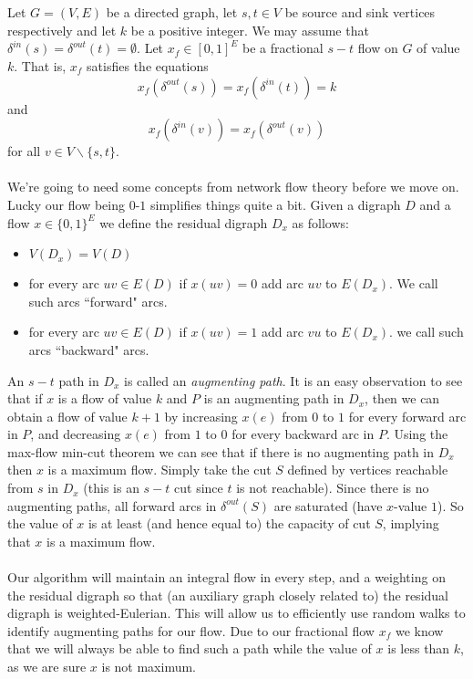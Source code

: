 \documentclass[letterpaper,12pt,oneside,onecolumn]{article}
\begin{document}
	\section{}
	\paragraph{}
	Let $G=(V,E)$ be a directed graph, let $s,t\in V$ be source and sink vertices respectively and let $k$ be a positive integer. We may assume that $\delta^{in}(s) = \delta^{out}(t) = \emptyset$. Let $x_f \in [0,1]^E$ be a fractional $s-t$ flow on $G$ of value $k$. That is, $x_f$ satisfies the equations
	$$ x_f(\delta^{out}(s)) = x_f(\delta^{in}(t)) = k$$
	and
	$$x_f(\delta^{in}(v)) = x_f(\delta^{out}(v))$$
	for all $v \in V\backslash\{s,t\}$.
	\paragraph{}
	We're going to need some concepts from network flow theory before we move on. Lucky our flow being $0$-$1$ simplifies things quite a bit. Given a digraph $D$ and a flow $x \in \{0,1\}^E$ we define the residual digraph $D_x$ as follows: 
	\begin{itemize}
		\item$V(D_x) = V(D)$
		\item for every arc $uv \in E(D)$ if $x(uv) = 0$ add arc $uv$ to $E(D_x)$. We call such arcs ``forward" arcs.
		\item for every arc $uv \in E(D)$ if $x(uv) = 1$ add arc $vu$ to $E(D_x)$. we call such arcs ``backward" arcs.
	\end{itemize} 
	An $s-t$ path in $D_x$ is called an \emph{augmenting path}. It is an easy observation to see that if $x$ is a flow of value $k$ and $P$ is an augmenting path in $D_x$, then we can obtain a flow of value $k+1$ by increasing $x(e)$ from $0$ to $1$ for every forward arc in $P$, and decreasing $x(e)$ from $1$ to $0$ for every backward arc in $P$. Using the max-flow min-cut theorem we can see that if there is no augmenting path in $D_x$ then $x$ is a maximum flow. Simply take the cut $S$ defined by vertices reachable from $s$ in $D_x$ (this is an $s-t$ cut since $t$ is not reachable). Since there is no augmenting paths, all forward arcs in $\delta^{out}(S)$ are saturated (have $x$-value $1$). So the value of $x$ is at least (and hence equal to) the capacity of cut $S$, implying that $x$ is a maximum flow.
	\paragraph{}
	Our algorithm will maintain an integral flow in every step, and a weighting on the residual digraph so that (an auxiliary graph closely related to) the residual digraph is weighted-Eulerian. This will allow us to efficiently use random walks to identify augmenting paths for our flow. Due to our fractional flow $x_f$ we know that we will always be able to find such a path while the value of $x$ is less than $k$, as we are sure $x$ is not maximum.
\end{document}
